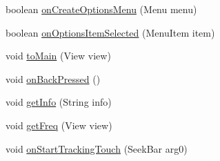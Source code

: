 \begin{DoxyCompactItemize}
\item 
boolean \hyperlink{classcom_1_1example_1_1android_1_1_bluetooth_chat_1_1_l_a_s_a_r_control_a8f7d87763ddaf085205a54e8477ecfce}{on\-Create\-Options\-Menu} (Menu menu)
\item 
boolean \hyperlink{classcom_1_1example_1_1android_1_1_bluetooth_chat_1_1_l_a_s_a_r_control_a37a55c533c74b60c0290ef1329d74e65}{on\-Options\-Item\-Selected} (Menu\-Item item)
\item 
void \hyperlink{classcom_1_1example_1_1android_1_1_bluetooth_chat_1_1_l_a_s_a_r_control_a1f166dbb18c9970efc1bc01b9b2e5c54}{to\-Main} (View view)
\item 
void \hyperlink{classcom_1_1example_1_1android_1_1_bluetooth_chat_1_1_l_a_s_a_r_control_acb776333595cb036bf935852041cb088}{on\-Back\-Pressed} ()
\item 
void \hyperlink{classcom_1_1example_1_1android_1_1_bluetooth_chat_1_1_l_a_s_a_r_control_a3d586a7ab265876564fc5c288cb38e0d}{get\-Info} (String info)
\item 
void \hyperlink{classcom_1_1example_1_1android_1_1_bluetooth_chat_1_1_l_a_s_a_r_control_adc846b4b8d9a9ee1e53b348432eb8aff}{get\-Freq} (View view)
\item 
void \hyperlink{classcom_1_1example_1_1android_1_1_bluetooth_chat_1_1_l_a_s_a_r_control_a281a2ae677c641ec8d556d283435bd40}{on\-Start\-Tracking\-Touch} (Seek\-Bar arg0)
\end{DoxyCompactItemize}
